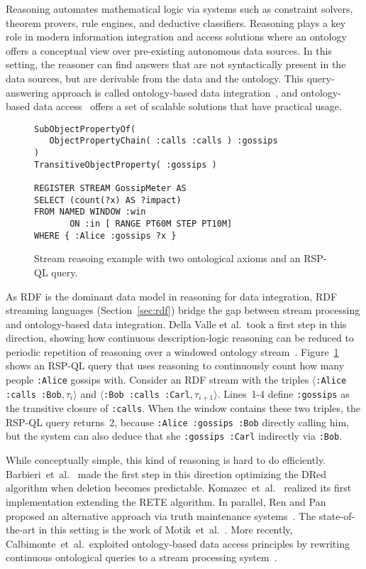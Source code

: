 Reasoning automates mathematical logic via systems such as constraint
solvers, theorem provers, rule engines, and deductive classifiers.
Reasoning plays a key role in modern information integration and
access solutions where an ontology offers a conceptual view over
pre-existing autonomous data sources. In this setting, the reasoner
can find answers that are not syntactically present in the data
sources, but are derivable from the data and the ontology.  This
query-answering approach is called ontology-based data
integration~\cite{DBLP:conf/pods/Lenzerini02}, and ontology-based data
access~\cite{DBLP:journals/jods/PoggiLCGLR08} offers a set of scalable
solutions that have practical usage.

\begin{figure}[!h]
\begin{lstlisting}[language=rsp-ql]
SubObjectPropertyOf(
   ObjectPropertyChain( :calls :calls ) :gossips
)
TransitiveObjectProperty( :gossips )

REGISTER STREAM GossipMeter AS
SELECT (count(?x) AS ?impact)
FROM NAMED WINDOW :win
       ON :in [ RANGE PT60M STEP PT10M]
WHERE { :Alice :gossips ?x }
\end{lstlisting}
\vspace*{-4mm}
\caption{\label{fig:sr}Stream reasoing example with two ontological axioms and an RSP-QL query.}
\end{figure}

As RDF is the dominant data model in reasoning for data integration,
RDF streaming languages (Section~\ref{sec:rdf}) bridge the gap between
stream processing and ontology-based data integration.  Della Valle et
al.\ took a first step in this direction, showing how continuous
description-logic reasoning can be reduced to periodic repetition of
reasoning over a windowed ontology
stream~\cite{DBLP:conf/fis/ValleCBBC08}.  Figure~\ref{fig:sr} shows an
RSP-QL query that uses reasoning to continuously count how many people
\lstinline{:Alice} gossips with. Consider an RDF stream with the
triples \mbox{$\langle$\lstinline{:Alice :calls :Bob}$,\tau_i\rangle$}
and \mbox{$\langle$\lstinline{:Bob :calls :Carl}$,\tau_{i+1}\rangle$}.
\mbox{Lines 1-4} define \lstinline{:gossips} as the transitive closure
of \lstinline{:calls}. When the window contains these two triples, the
RSP-QL query returns~2, because \lstinline{:Alice :gossips :Bob}
directly calling him, but the system can also deduce that she
\lstinline{:gossips :Carl} indirectly via \lstinline{:Bob}.

While conceptually simple, this kind of reasoning is hard to do
efficiently. Barbieri~et~al.~\cite{DBLP:conf/esws/BarbieriBCVG10} made
the first step in this direction optimizing the DRed algorithm when
deletion becomes predictable.
Komazec~et~al.~\cite{DBLP:conf/debs/KomazecCF12} realized its first
implementation extending the RETE algorithm. In parallel, Ren and Pan
proposed an alternative approach via truth maintenance
systems~\cite{Ren2011}. The state-of-the-art in this setting is the
work of Motik~et~al.~\cite{DBLP:conf/aaai/MotikNPH15a}.  More
recently, Calbimonte~et~al.\ exploited ontology-based data access
principles by rewriting continuous ontological queries to a stream
processing system~\cite{DBLP:conf/esws/CalbimonteMC16}.

